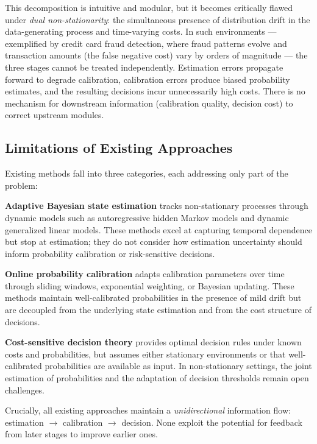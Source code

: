 \documentclass[12pt,a4paper]{article}
\begin{document}
This decomposition is intuitive and modular, but it becomes critically flawed under \emph{dual non-stationarity}: the simultaneous presence of distribution drift in the data-generating process and time-varying costs. In such environments --- exemplified by credit card fraud detection, where fraud patterns evolve and transaction amounts (the false negative cost) vary by orders of magnitude --- the three stages cannot be treated independently. Estimation errors propagate forward to degrade calibration, calibration errors produce biased probability estimates, and the resulting decisions incur unnecessarily high costs. There is no mechanism for downstream information (calibration quality, decision cost) to correct upstream modules.

\subsection{Limitations of Existing Approaches}

Existing methods fall into three categories, each addressing only part of the problem:

\textbf{Adaptive Bayesian state estimation} \citep{Gamerman1998,Dunson2010,West1985} tracks non-stationary processes through dynamic models such as autoregressive hidden Markov models and dynamic generalized linear models. These methods excel at capturing temporal dependence but stop at estimation; they do not consider how estimation uncertainty should inform probability calibration or risk-sensitive decisions.

\textbf{Online probability calibration} \citep{Guo2017,Kumar2019,Raftery2005} adapts calibration parameters over time through sliding windows, exponential weighting, or Bayesian updating. These methods maintain well-calibrated probabilities in the presence of mild drift but are decoupled from the underlying state estimation and from the cost structure of decisions.

\textbf{Cost-sensitive decision theory} \citep{Elkan2001,Berger1985} provides optimal decision rules under known costs and probabilities, but assumes either stationary environments or that well-calibrated probabilities are available as input. In non-stationary settings, the joint estimation of probabilities and the adaptation of decision thresholds remain open challenges.

Crucially, all existing approaches maintain a \emph{unidirectional} information flow: estimation $\to$ calibration $\to$ decision. None exploit the potential for feedback from later stages to improve earlier ones.
\end{document}
